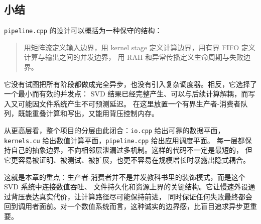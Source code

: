 \subsection{小结}

\texttt{pipeline.cpp} 的设计可以概括为一种保守的结构：

\begin{quote}
    用矩阵流定义输入边界，用 kernel stage 定义计算边界，用有界 FIFO 定义计算与输出之间的并发边界，
    用 RAII 和异常传播定义生命周期与失败边界。
\end{quote}

它没有试图把所有阶段都做成完全异步，也没有引入复杂调度器。相反，它选择了一个最小而有效的并发点：
SVD 结果已经完整产生、可以与后续计算解耦，而写入又可能因文件系统产生不可预测延迟。
在这里放置一个有界生产者-消费者队列，既能重叠计算和写出，又能用背压控制内存。

从更高层看，整个项目的分层由此闭合：\texttt{io.cpp} 给出可靠的数据平面，
\texttt{kernels.cu} 给出数值计算平面，\texttt{pipeline.cpp} 给出应用调度平面。
每一层都保持自己的抽象边界，不向相邻层泄漏过多机制。这样的代码不一定是最短的，
但它更容易被证明、被测试、被扩展，也更不容易在规模增长时暴露出隐式耦合。

这就是本章的重点：生产者-消费者并不是并发教科书里的装饰模式，而是这个 SVD 系统中连接数值吞吐、
文件持久化和资源上界的关键结构。它让慢速外设通过背压表达真实代价，让计算路径尽可能保持前进，
同时保证任何失败最终都会回到调用者面前。对一个数值系统而言，这种诚实的边界感，比盲目追求异步更重要。
